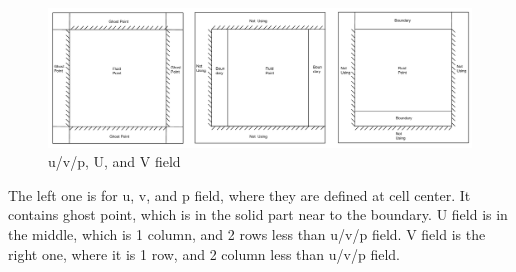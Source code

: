 \documentclass[12pt]{article}
\begin{document}
\begin{figure}[H]
    \centering
    \includegraphics[width=0.9\linewidth]{figure/Domain.jpg}
    \caption{u/v/p, U, and V field}
\end{figure}

The left one is for u, v, and p field, where they are defined at cell center. It contains ghost point, which is in the solid part near to the boundary. U field is in the middle, which is 1 column, and 2 rows less than u/v/p field. V field is the right one, where it is 1 row, and 2 column less than u/v/p field.


  


  
\end{document}
